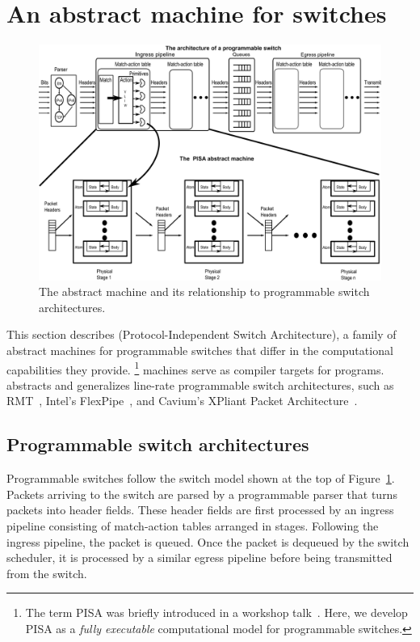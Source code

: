 \section{An abstract machine for switches}
\label{s:absmachine}

\begin{figure}[!t]
  \includegraphics[width=\textwidth]{pisa.pdf}
  \caption{The \absmachine abstract machine and its relationship to
  programmable switch architectures.}
  \label{fig:switch}
\end{figure}

This section describes \absmachine (Protocol-Independent Switch Architecture), a
family of abstract machines for programmable switches that differ in the
computational capabilities they provide.  \footnote{The term PISA was briefly
introduced in a workshop talk~\cite{nick_p4}.  Here, we develop PISA
as a \textit{fully executable} computational model for programmable
switches.} \absmachine machines serve as compiler targets for \pktlanguage
programs.  \absmachine abstracts and generalizes line-rate
programmable switch architectures, such as RMT~\cite{rmt}, Intel's
FlexPipe~\cite{flexpipe}, and Cavium's XPliant Packet
Architecture~\cite{xpliant}.

\subsection{Programmable switch architectures}
Programmable switches follow the switch model shown at the top of
Figure~\ref{fig:switch}.  Packets arriving to the switch are parsed by a
programmable parser that turns packets into header fields. These header fields
are first processed by an ingress pipeline consisting of match-action tables
arranged in stages.  Following the ingress pipeline, the packet is queued. Once
the packet is dequeued by the switch scheduler, it is processed by a similar
egress pipeline before being transmitted from the switch.

